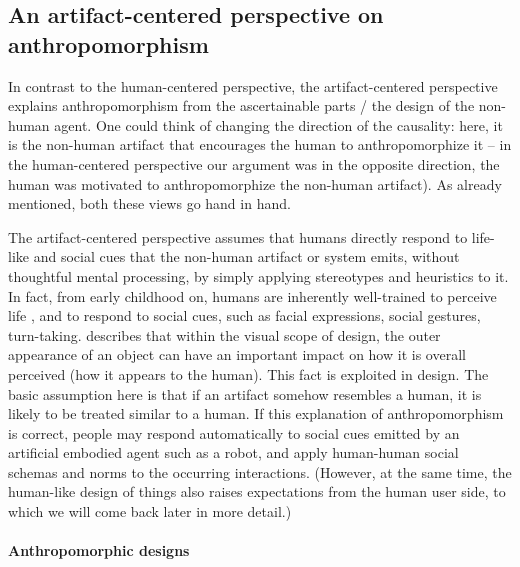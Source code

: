 \documentclass{frontiersSCNS} %
\begin{document}
\subsection{An artifact-centered perspective on anthropomorphism}
\label{sec:anthropomorphic-design}

In contrast to the human-centered perspective, the artifact-centered perspective explains anthropomorphism from the ascertainable parts / the design of the non-human agent.
One could think of changing the direction of the causality: here, it is the non-human artifact that encourages the human to anthropomorphize it -- in the human-centered perspective our argument was in the opposite direction, the human was motivated to anthropomorphize the non-human artifact). As already mentioned, both these views go hand in hand.

The artifact-centered perspective assumes that humans directly respond to life-like and social cues that the non-human artifact or system emits, without thoughtful mental processing, by simply applying stereotypes and heuristics to it. In fact, from early childhood on, humans are inherently well-trained to perceive life \citep{epley_seeing_2007}, and to respond to social cues, such as facial expressions, social gestures, turn-taking. \cite{schmitz_concepts_2011} describes that within the visual scope of design, the outer appearance of an object can have an important impact on how it is overall perceived (how it appears to the human). This fact is exploited in design. The basic assumption  here is that if an artifact somehow resembles a human, it is likely to be treated similar to a human. If this explanation of anthropomorphism is correct, people may respond automatically to social cues emitted by an artificial embodied agent such as a robot, and apply human-human social schemas and norms to the occurring interactions. (However, at the same time, the human-like design of things also raises expectations from the human user side, to which we will come back later in more detail.)


\paragraph*{Anthropomorphic designs\\ \\}
\end{document}
